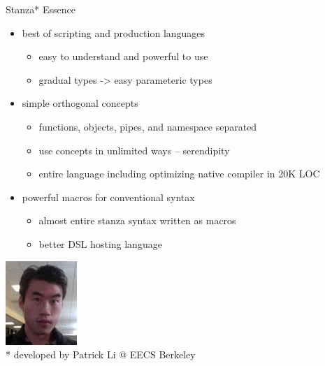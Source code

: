 % 
% 
% 
% 
% 
% 
% 

\begin{frame}[fragile]{Stanza* Essence}
\begin{itemize}
\item best of scripting and production languages
\begin{itemize}
\item easy to understand and powerful to use
\item gradual types -> easy parameteric types
\end{itemize}
\item simple orthogonal concepts
\begin{itemize}
\item functions, objects, pipes, and namespace separated
\item use concepts in unlimited ways -- serendipity
\item entire language including optimizing native compiler in 20K LOC
\end{itemize}
\item powerful macros for conventional syntax
\begin{itemize}
\item almost entire stanza syntax written as macros
\item better DSL hosting language
\end{itemize}
\end{itemize}
\vspace{0.25cm}
\begin{center}
\includegraphics[height=0.2\textheight]{figs/patrick.jpg} \\
* developed by Patrick Li @ EECS Berkeley
\end{center}
\end{frame}

